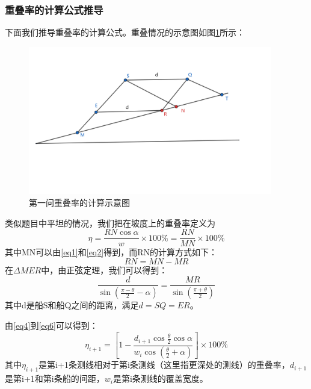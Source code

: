 \documentclass{article}
\begin{document}
\subsubsection{重叠率的计算公式推导}
	\par 下面我们推导重叠率的计算公式。重叠情况的示意图如图\ref{pro1Eta}所示：
		\begin{figure}[H]
		\centering  %
		\includegraphics[width=0.95\textwidth]{问题一//问题一重叠率示意图}
		\caption{第一问重叠率的计算示意图}
		\label{pro1Eta}
	\end{figure}
	
	\par 类似题目中平坦的情况，我们把在坡度上的重叠率定义为
	\begin{equation}
	\eta = \frac{RN\cos\alpha}{w}\times 100\%=\frac{RN}{MN}\times 100\%  \label{eq4}
	\end{equation}
	其中MN可以由\eqref{eq1}和\eqref{eq2}得到，而RN的计算方式如下：
	\begin{equation}
		RN = MN - MR  \label{eq5}
	\end{equation}
	在$\Delta MER$中，由正弦定理，我们可以得到：
	\begin{equation}
		\frac{d}{\sin(\frac{\pi-\theta}{2}-\alpha)} = \frac{MR}{\sin(\frac{\pi+\theta}{2})}  \label{eq6}
	\end{equation}
	其中d是船S和船Q之间的距离，满足$d=SQ=ER$。
	\par	由\eqref{eq4}到\eqref{eq6}可以得到：
	\begin{equation}
		\eta_{i+1} = \left[ 1 - \frac{d_{i+1}\cos\frac{\theta}{2}\cos\alpha}{w_i\cos(\frac{\theta}{2}+\alpha)}\right]\times 100 \% \label{eq7}
	\end{equation}
	其中$\eta_{i+1}$是第i+1条测线相对于第i条测线（这里指更深处的测线）的重叠率，$d_{i+1}$是第i+1和第i条船的间距，$w_i$是第i条测线的覆盖宽度。
	
\end{document}
